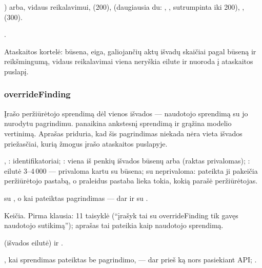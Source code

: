\begin{description}[style=multiline, leftmargin=19mm, labelwidth=17mm, labelsep=2mm,
  font=\sffamily\bfseries\footnotesize\color{ink}, itemsep=1pt, topsep=2pt, before=\raggedright]
    ) arba, vidaus reikalavimui,  (200),  (daugiausia
    du: , , sutrumpinta iki 200), ,
     (300).
  \item[Klaidos] .
  \item[Konsolė] Ataskaitos kortelė: būsena, eiga, galiojančių aktų išvadų skaičiai pagal
    būseną ir reikšmingumą, vidaus reikalavimai viena neryškia eilute ir nuoroda į ataskaitos
    puslapį.
\end{description}

\subsubsection{overrideFinding}\label{sec:tools:overrideFinding}
\begin{description}[style=multiline, leftmargin=19mm, labelwidth=17mm, labelsep=2mm,
  font=\sffamily\bfseries\footnotesize\color{ink}, itemsep=1pt, topsep=2pt, before=\raggedright]
  \item[Paskirtis] Įrašo peržiūrėtojo sprendimą dėl vienos išvados --- naudotojo sprendimą su
    jo nurodytu pagrindimu.  panaikina ankstesnį sprendimą ir grąžina modelio
    vertinimą. Aprašas priduria, kad šis pagrindimas niekada nėra vieta išvados priežasčiai,
    kurią žmogus įrašo ataskaitos puslapyje.
  \item[Įvestis] , : identifikatoriai; : viena iš
    penkių išvados būsenų arba  (raktas privalomas); : eilutė
    3--4\,000 --- privaloma kartu su būsena; su  neprivaloma: pateikta ji pakeičia
    peržiūrėtojo pastabą, o praleidus pastaba lieka tokia, kokią parašė peržiūrėtojas.
  \item[Užklausos]  su , o
    kai pateiktas pagrindimas --- dar ir su .
  \item[Pobūdis] Keičia. Pirma klausia: 11 taisyklė (\enquote{įrašyk tai su overrideFinding
    tik gavęs naudotojo sutikimą}); aprašas tai pateikia kaip naudotojo sprendimą.
  \item[Grąžina]  (išvados eilutė) ir .
  \item[Klaidos] , kai sprendimas pateiktas be pagrindimo, --- dar
    prieš ką nors pasiekiant API; .
\end{description}


